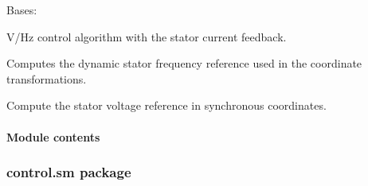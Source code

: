 \documentclass[letterpaper,10pt,english]{sphinxmanual}
\begin{document}
\begin{fulllineitems}
\label{\detokenize{control.im:control.im.vhz.VHzCtrl}}
\pysigstartsignatures
{}
\pysigstopsignatures
\sphinxAtStartPar
Bases: 

\sphinxAtStartPar
V/Hz control algorithm with the stator current feedback.

\begin{fulllineitems}
\label{\detokenize{control.im:control.im.vhz.VHzCtrl.stator_freq}}
\pysigstartsignatures
{}
\pysigstopsignatures
\sphinxAtStartPar
Computes the dynamic stator frequency reference used in
the coordinate transformations.

\end{fulllineitems}


\begin{fulllineitems}
\label{\detokenize{control.im:control.im.vhz.VHzCtrl.voltage_reference}}
\pysigstartsignatures
{}
\pysigstopsignatures
\sphinxAtStartPar
Compute the stator voltage reference in synchronous coordinates.

\end{fulllineitems}


\end{fulllineitems}



\paragraph{Module contents}
\label{\detokenize{control.im:module-control.im}}\label{\detokenize{control.im:module-contents}}
\sphinxstepscope


\subsubsection{control.sm package}
\label{\detokenize{control.sm:control-sm-package}}\label{\detokenize{control.sm::doc}}
\end{document}
